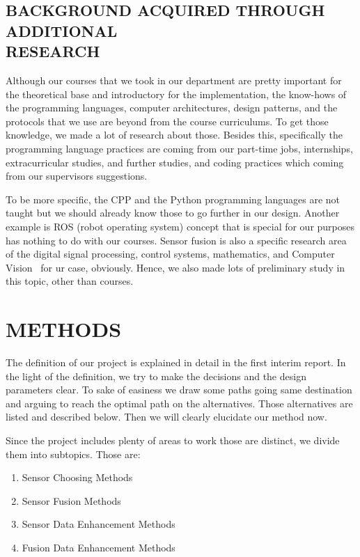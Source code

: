 \documentclass[12pt]{article}
\begin{document}
    \subsection{BACKGROUND ACQUIRED THROUGH ADDITIONAL\\ RESEARCH}

    Although our courses that we took in our department are pretty important for the theoretical base and introductory for the implementation, the know-hows of the programming languages, computer architectures, design patterns, and the protocols that we use are beyond from the course curriculums. To get those knowledge, we made a lot of research about those. Besides this, specifically the programming language practices are coming from our part-time jobs, internships, extracurricular studies, and further studies, and coding practices which coming from our supervisors suggestions.

    To be more specific, the CPP and the Python programming languages are not taught but we should already know those to go further in our design. Another example is ROS (robot operating system) concept that is special for our purposes has nothing to do with our courses. Sensor fusion is also a specific research area of the digital signal processing, control systems, mathematics, and Computer Vision~\cite{enwiki:1120271364} for ur case, obviously. Hence, we also made lots of preliminary study in this topic, other than courses.
    

\section{METHODS}

The definition of our project is explained in detail in the first interim report. In the light of the definition, we try to make the decisions and the design parameters clear. To sake of easiness we draw some paths going same destination and arguing to reach the optimal path on the alternatives. Those alternatives are listed and described below. Then we will clearly elucidate our method now.

Since the project includes plenty of areas to work those are distinct, we divide them into subtopics. Those are:

\begin{enumerate}
    \item Sensor Choosing Methods
    \item Sensor Fusion Methods
    \item Sensor Data Enhancement Methods
    \item Fusion Data Enhancement Methods
\end{enumerate}
\end{document}

